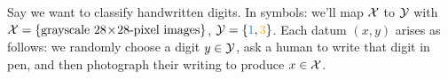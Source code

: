 


  Say we want to classify handwritten digits.
  In symbols: we'll map $\mathcal{X}$ to $\mathcal{Y}$ with $\mathcal{X} =
  \{\text{grayscale~}28\!\times\!28\text{-pixel images}\}$,
  $\yY=\{{\blu{1}},{\rng{3}}\}$.
  Each datum $(x,y)$ arises as follows: we randomly choose a digit $y\in \mathcal{Y}$,
  ask a human to write that digit in pen, and then photograph their writing to
  produce $x\in\mathcal{X}$.
  \newcommand{\mnistex}[2]{%
      \texttt{[image: example-mnist/mnist-trn-\#1]}\vspace{-0.2cm}%
      \\#2%
  }
  \vspace{-0.25cm}
